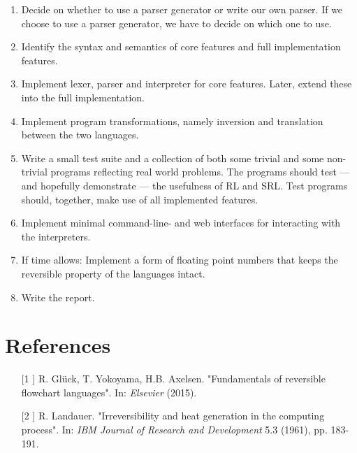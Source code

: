 \begin{enumerate}

  \item Decide on whether to use a parser generator or write our own parser. If we choose to use a parser generator, we have to decide on which one to use.

  \item Identify the syntax and semantics of core features and full implementation features.

  \item Implement lexer, parser and interpreter for core features. Later, extend these into the full implementation.

  \item Implement program transformations, namely inversion and translation between the two languages.

  \item Write a small test suite and a collection of both some trivial and some non-trivial programs reflecting real world problems. The programs should test --- and hopefully demonstrate --- the usefulness of RL and SRL. Test programs should, together, make use of all implemented features.

  \item Implement minimal command-line- and web interfaces for interacting with the interpreters.

  \item If time allows: Implement a form of floating point numbers that keeps the reversible property of the languages intact.

  \item Write the report.

\end{enumerate}


\appendix
\section{References}

\begin{enumerate}
    \item[[1]] R. Glück, T. Yokoyama, H.B. Axelsen. "Fundamentals of reversible flowchart languages". In: \textit{Elsevier} (2015).
  \item[[2]] R. Landauer. "Irreversibility and heat generation in the computing process". In: \textit{IBM Journal of Research and Development} 5.3 (1961), pp. 183-191.
\end{enumerate}
